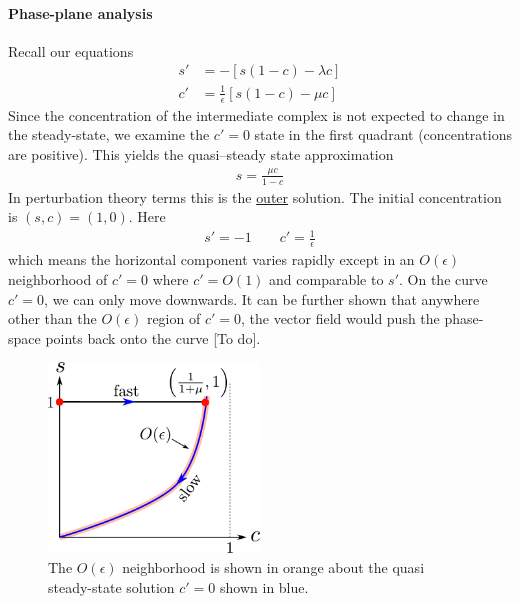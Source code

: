 \paragraph{Phase-plane analysis} Recall our equations
\begin{align*}
	s' &= -\left[s(1-c) - \lambda c\right] \\
	c' &= \frac{1}{\epsilon} \left[s(1-c) - \mu c\right]
\end{align*}
Since the concentration of the intermediate complex is not expected to change in the steady-state, we examine the $c'=0$ state in the first quadrant (concentrations are positive). This yields the quasi--steady state approximation
\begin{gather*}
	s = \frac{\mu c}{1-c}
\end{gather*} 
In perturbation theory terms this is the \underline{outer} solution. The initial concentration is $(s,c)=(1,0)$. Here
\begin{align*}
s' = -1 \qquad c' = \frac{1}{\epsilon} 
\end{align*}
which means the horizontal component varies rapidly except in an $O(\epsilon)$ neighborhood of $c'=0$ where $c'=O(1)$ and comparable to $s'$. On the curve $c'=0$, we can only move downwards. It can be further shown that anywhere other than the $O(\epsilon)$ region of $c'=0$, the vector field would push the phase-space points back onto the curve {\color{red} [To do]}. 
\begin{figure}[!h]
	\centering
	\includegraphics[width=0.5\textwidth]{./plots/pdf/MichaelisMenten.pdf}
	\caption{The $O(\epsilon)$ neighborhood is shown in orange about the quasi steady-state solution $c'=0$ shown in blue.}
	\label{fig:strogatz-wk17}
\end{figure}

